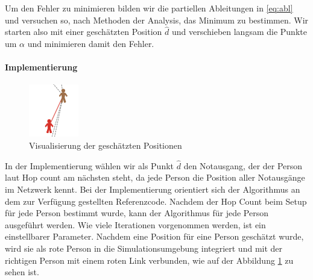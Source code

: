 Um den Fehler zu minimieren bilden wir die partiellen Ableitungen in \ref{eq:abl} und versuchen so, nach Methoden der Analysis, das Minimum zu bestimmen. Wir starten also mit einer geschätzten Position \( \hat d \) und verschieben langsam die Punkte um \( \alpha \) und minimieren damit den Fehler.

\paragraph{Implementierung} 

\begin{figure}[h!]
\centering
\includegraphics{algorithmik/visu}
\caption{Visualisierung der geschätzten Positionen}
 \label{visu}
\end{figure}

In der Implementierung wählen wir als Punkt \( \hat d \) den Notausgang, der der Person laut Hop count am nächsten steht, da jede Person die Position aller Notausgänge im Netzwerk kennt. Bei der Implementierung orientiert sich der Algorithmus an dem zur Verfügung gestellten Referenzcode. Nachdem der Hop Count beim Setup für jede Person bestimmt wurde, kann der Algorithmus für jede Person ausgeführt werden. Wie viele Iterationen vorgenommen werden, ist ein einstellbarer Parameter. Nachdem eine Position für eine Person geschätzt wurde, wird sie als rote Person in die Simulationsumgebung integriert und mit der richtigen Person mit einem roten Link verbunden, wie auf der Abbildung \ref{visu} zu sehen ist.




